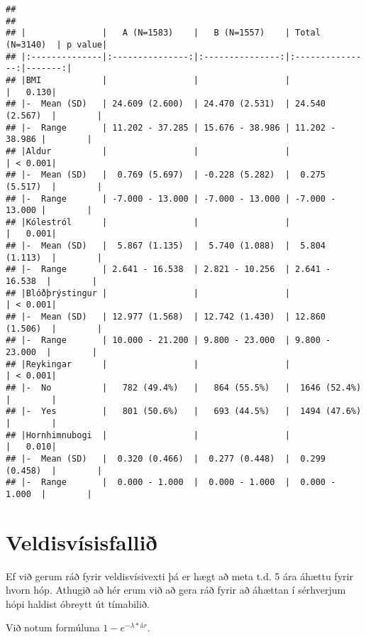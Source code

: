 \documentclass[
]{book}
\begin{document}
\begin{verbatim}
## 
## 
## |               |   A (N=1583)    |   B (N=1557)    | Total (N=3140)  | p value|
## |:--------------|:---------------:|:---------------:|:---------------:|-------:|
## |BMI            |                 |                 |                 |   0.130|
## |-  Mean (SD)   | 24.609 (2.600)  | 24.470 (2.531)  | 24.540 (2.567)  |        |
## |-  Range       | 11.202 - 37.285 | 15.676 - 38.986 | 11.202 - 38.986 |        |
## |Aldur          |                 |                 |                 | < 0.001|
## |-  Mean (SD)   |  0.769 (5.697)  | -0.228 (5.282)  |  0.275 (5.517)  |        |
## |-  Range       | -7.000 - 13.000 | -7.000 - 13.000 | -7.000 - 13.000 |        |
## |Kólestról      |                 |                 |                 |   0.001|
## |-  Mean (SD)   |  5.867 (1.135)  |  5.740 (1.088)  |  5.804 (1.113)  |        |
## |-  Range       | 2.641 - 16.538  | 2.821 - 10.256  | 2.641 - 16.538  |        |
## |Blóðþrýstingur |                 |                 |                 | < 0.001|
## |-  Mean (SD)   | 12.977 (1.568)  | 12.742 (1.430)  | 12.860 (1.506)  |        |
## |-  Range       | 10.000 - 21.200 | 9.800 - 23.000  | 9.800 - 23.000  |        |
## |Reykingar      |                 |                 |                 | < 0.001|
## |-  No          |   782 (49.4%)   |   864 (55.5%)   |  1646 (52.4%)   |        |
## |-  Yes         |   801 (50.6%)   |   693 (44.5%)   |  1494 (47.6%)   |        |
## |Hornhimnubogi  |                 |                 |                 |   0.010|
## |-  Mean (SD)   |  0.320 (0.466)  |  0.277 (0.448)  |  0.299 (0.458)  |        |
## |-  Range       |  0.000 - 1.000  |  0.000 - 1.000  |  0.000 - 1.000  |        |
\end{verbatim}

\hypertarget{veldisvuxedsisfalliuxf0}{%
\section{Veldisvísisfallið}\label{veldisvuxedsisfalliuxf0}}

Ef við gerum ráð fyrir veldisvísivexti þá er hægt að meta t.d. 5 ára áhættu fyrir hvorn hóp. Athugið að hér erum við að gera ráð fyrir að áhættan í sérhverjum hópi haldist óbreytt út tímabilið.

Við notum formúluna \(1-e^{-\lambda*ár}\).
\end{document}
